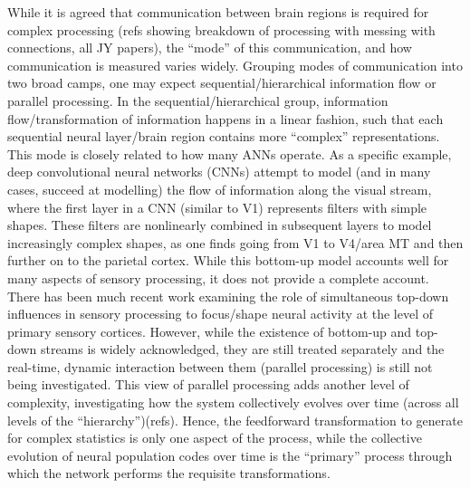 \begin{refsection}
While it is agreed that communication between brain regions is required for complex processing (refs showing breakdown of processing with messing with connections, all JY papers), the “mode” of this communication, and how communication is measured varies widely. Grouping modes of communication into two broad camps, one may expect sequential/hierarchical information flow or parallel processing. In the sequential/hierarchical group, information flow/transformation of information happens in a linear fashion, such that each sequential neural layer/brain region contains more “complex” representations. This mode is closely related to how many ANNs operate. As a specific example, deep convolutional neural networks (CNNs) attempt to model (and in many cases, succeed at modelling) the flow of information along the visual stream, where the first layer in a CNN (similar to V1) represents filters with simple shapes. These filters are nonlinearly combined in subsequent layers to model increasingly complex shapes, as one finds going from V1 to V4/area MT and then further on to the parietal cortex. While this bottom-up model accounts well for many aspects of sensory processing, it does not provide a complete account. There has been much recent work examining the role of simultaneous top-down influences in sensory processing to focus/shape neural activity at the level of primary sensory cortices. However, while the existence of bottom-up and top-down streams is widely acknowledged, they are still treated separately and the real-time, dynamic interaction between them (parallel processing) is still not being investigated. This view of parallel processing adds another level of complexity, investigating how the system collectively evolves over time (across all levels of the “hierarchy”)(refs). Hence, the feedforward transformation to generate for complex statistics is only one aspect of the process, while the collective evolution of neural population codes over time is the “primary” process through which the network performs the requisite transformations.

\end{refsection}
